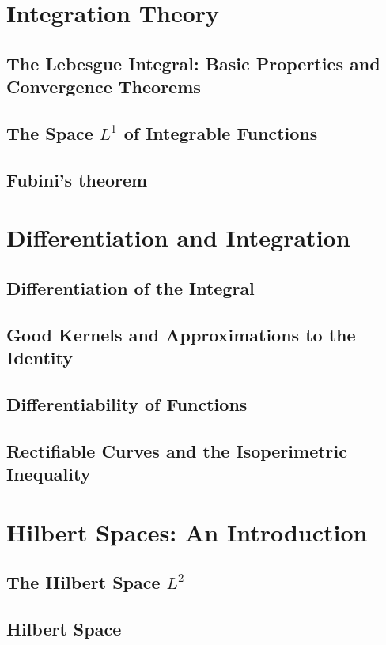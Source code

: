 \documentclass[12pt, a4paper, openany, twoside]{book}
\theoremstyle{definition}
\theoremstyle{remark}
\theoremstyle{plain}
\numberwithin{equation}{section}
\begin{document}
\newpage



\chapter{Integration Theory}
\section{The Lebesgue Integral: Basic Properties and Convergence Theorems}
\section{The Space $L^1$ of Integrable Functions}
\section{Fubini's theorem}

\newpage

\chapter{Differentiation and Integration}
\section{Differentiation of the Integral}
\section{Good Kernels and Approximations to the Identity}
\section{Differentiability of Functions}
\section{Rectifiable Curves and the Isoperimetric Inequality}

\newpage
\chapter{Hilbert Spaces: An Introduction}
\section{The Hilbert Space $L^2$}
\section{Hilbert Space}
\end{document}
